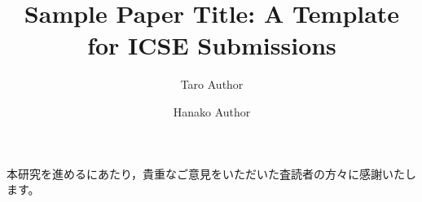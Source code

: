 \documentclass{icse-ja}
\title{Sample Paper Title: A Template for ICSE Submissions}
\author{Taro Author}
\affiliation{%
  \institution{A大学 情報科学研究科}
  \city{東京}
  \country{日本}
}
\author{Hanako Author}
\affiliation{%
  \institution{B研究所}
  \city{大阪}
  \country{日本}
}
\begin{document}
\maketitle






\begin{acks}
本研究を進めるにあたり，貴重なご意見をいただいた査読者の方々に感謝いたします。
\end{acks}




\end{document}
